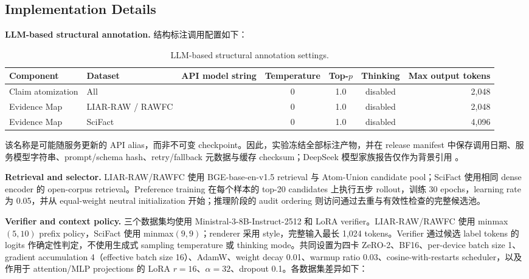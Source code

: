 \documentclass[letterpaper]{article}
\begin{document}
\subsection{Implementation Details}

\textbf{LLM-based structural annotation.} 结构标注调用配置如下：

\begin{table}[t]
\centering
\small
\setlength{\tabcolsep}{3.5pt}
\renewcommand{\arraystretch}{1.08}
\caption{LLM-based structural annotation settings.}
\label{tab:annotation-settings}
\begin{tabularx}{\textwidth}{@{}l l Y c c c r@{}}
\toprule
\textbf{Component} & \textbf{Dataset} & \textbf{API model string} & \textbf{Temperature} & \textbf{Top-$p$} & \textbf{Thinking} & \textbf{Max output tokens} \\
\midrule
Claim atomization & All & \texttt{} & 0 & 1.0 & disabled & 2,048 \\
Evidence Map & LIAR-RAW / RAWFC & \texttt{} & 0 & 1.0 & disabled & 2,048 \\
Evidence Map & SciFact & \texttt{} & 0 & 1.0 & disabled & 4,096 \\
\bottomrule
\end{tabularx}
\end{table}

该名称是可能随服务更新的 API alias，而非不可变 checkpoint。因此，实验冻结全部标注产物，并在 release manifest 中保存调用日期、服务模型字符串、prompt/schema hash、retry/fallback 元数据与缓存 checksum；DeepSeek 模型家族报告仅作为背景引用 \citep{DeepSeekAI2024V3}。

\textbf{Retrieval and selector.} LIAR-RAW/RAWFC 使用 BGE-base-en-v1.5 retrieval 与 Atom-Union candidate pool；SciFact 使用相同 dense encoder 的 open-corpus retrieval。Preference training 在每个样本的 top-20 candidates 上执行五步 rollout，训练 30 epochs，learning rate 为 0.05，并从 equal-weight neutral initialization 开始；推理阶段的 audit ordering 则访问通过去重与有效性检查的完整候选池。

\textbf{Verifier and context policy.} 三个数据集均使用 Ministral-3-8B-Instruct-2512 \citep{MistralAI2025Ministral3} 和 LoRA verifier。LIAR-RAW/RAWFC 使用 minmax$(5,10)$ prefix policy，SciFact 使用 minmax$(9,9)$；renderer 采用 \texttt{} style，完整输入最长 1,024 tokens。Verifier 通过候选 label tokens 的 logits 作确定性判定，不使用生成式 sampling temperature 或 thinking mode。共同设置为四卡 ZeRO-2、BF16、per-device batch size 1、gradient accumulation 4（effective batch size 16）、AdamW、weight decay 0.01、warmup ratio 0.03、cosine-with-restarts scheduler，以及作用于 attention/MLP projections 的 LoRA $r=16$、$\alpha=32$、dropout 0.1。各数据集差异如下：
\end{document}
